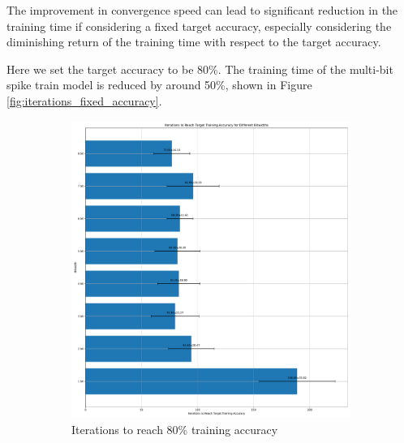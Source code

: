         The improvement in convergence speed can lead to significant reduction in the training time if considering a fixed target accuracy, especially considering the diminishing return of the training time with respect to the target accuracy. 

        Here we set the target accuracy to be 80\%. The training time of the multi-bit spike train model is reduced by around 50\%, shown in Figure \ref{fig:iterations_fixed_accuracy}. 
        \begin{figure}[!htpb]
            \centering
            \begin{subfigure}[H]{0.47\textwidth}
                \centering
                \includegraphics[width=\textwidth]{../standard/FashionMNIST/plots/fashionmnist_train_iters.pdf}
                \caption{Iterations to reach 80\% training accuracy}
            \end{subfigure}
            \hfill
            \begin{subfigure}[H]{0.47\textwidth}
                \centering

\end{subfigure}
\end{figure}
